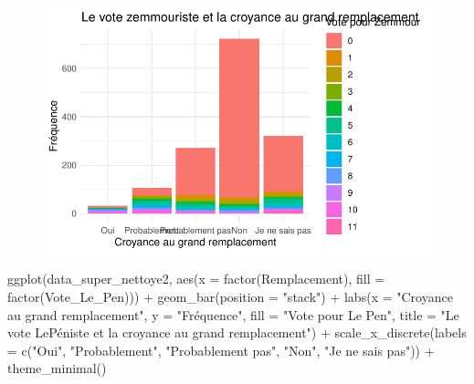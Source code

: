 \documentclass[
  letterpaper,
  DIV=11,
  numbers=noendperiod]{scrartcl}
\newenvironment{Shaded}{\begin{snugshade}}{\end{snugshade}}
\newcommand{\AttributeTok}[1]{\textcolor[rgb]{0.40,0.45,0.13}{#1}}
\newcommand{\FunctionTok}[1]{\textcolor[rgb]{0.28,0.35,0.67}{#1}}
\newcommand{\NormalTok}[1]{\textcolor[rgb]{0.00,0.23,0.31}{#1}}
\newcommand{\SpecialCharTok}[1]{\textcolor[rgb]{0.37,0.37,0.37}{#1}}
\newcommand{\StringTok}[1]{\textcolor[rgb]{0.13,0.47,0.30}{#1}}
\begin{document}
\begin{figure}[H]

{\centering \includegraphics{travail_session_Akyildiz_files/figure-pdf/unnamed-chunk-4-1.pdf}

}

\end{figure}

\begin{Shaded}
\begin{Highlighting}[]
\FunctionTok{ggplot}\NormalTok{(data\_super\_nettoye2, }\FunctionTok{aes}\NormalTok{(}\AttributeTok{x =} \FunctionTok{factor}\NormalTok{(Remplacement), }\AttributeTok{fill =} \FunctionTok{factor}\NormalTok{(Vote\_Le\_Pen))) }\SpecialCharTok{+}
  \FunctionTok{geom\_bar}\NormalTok{(}\AttributeTok{position =} \StringTok{"stack"}\NormalTok{) }\SpecialCharTok{+}
  \FunctionTok{labs}\NormalTok{(}\AttributeTok{x =} \StringTok{"Croyance au grand remplacement"}\NormalTok{, }\AttributeTok{y =} \StringTok{"Fréquence"}\NormalTok{, }\AttributeTok{fill =} \StringTok{"Vote pour Le Pen"}\NormalTok{, }\AttributeTok{title =} \StringTok{"Le vote LePéniste et la croyance au grand remplacement"}\NormalTok{) }\SpecialCharTok{+}
  \FunctionTok{scale\_x\_discrete}\NormalTok{(}\AttributeTok{labels =} \FunctionTok{c}\NormalTok{(}\StringTok{"Oui"}\NormalTok{, }\StringTok{"Probablement"}\NormalTok{, }\StringTok{"Probablement pas"}\NormalTok{, }\StringTok{"Non"}\NormalTok{, }\StringTok{"Je ne sais pas"}\NormalTok{)) }\SpecialCharTok{+}
  \FunctionTok{theme\_minimal}\NormalTok{()}
\end{Highlighting}
\end{Shaded}
\end{document}
